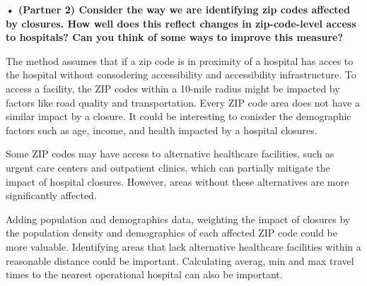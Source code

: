 \documentclass[
  letterpaper,
  DIV=11,
  numbers=noendperiod]{scrartcl}
\begin{document}
\textbf{• (Partner 2) Consider the way we are identifying zip codes
affected by closures. How well does this reflect changes in
zip-code-level access to hospitals? Can you think of some ways to
improve this measure?}

The method assumes that if a zip code is in proximity of a hospital has
acces to the hospital without consodering accessibility and
accessibility infrastructure. To access a facility, the ZIP codes within
a 10-mile radius might be impacted by factors like road quality and
transportation. Every ZIP code area does not have a similar impact by a
closure. It could be interesting to conisder the demographic factors
such as age, income, and health impacted by a hospital closures.

Some ZIP codes may have access to alternative healthcare facilities,
such as urgent care centers and outpatient clinics, which can partially
mitigate the impact of hospital closures. However, areas without these
alternatives are more significantly affected.

Adding population and demographics data, weighting the impact of
closures by the population density and demographics of each affected ZIP
code could be more valuable. Identifying areas that lack alternative
healthcare facilities within a reasonable distance could be important.
Calculating averag, min and max travel times to the nearest operational
hospital can also be important.
\end{document}
